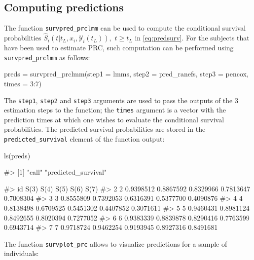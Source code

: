 \subsection{Computing predictions}\label{computing-predictions}

The function \texttt{survpred\_prclmm} can be used to compute the
conditional survival probabilities
\(\hat{S}_i(t | t_L, x_i, \mathcal{Y}_i(t_L)),\) \(t \geq t_L\) in
\eqref{eq:predsurv}. For the subjects that have been used to estimate
PRC, such computation can be performed using \texttt{survpred\_prclmm}
as follows:

\begin{Schunk}
\begin{Sinput}
preds = survpred_prclmm(step1 = lmms, step2 = pred_ranefs, step3 = pencox, times = 3:7)
\end{Sinput}
\end{Schunk}

The \texttt{step1}, \texttt{step2} and \texttt{step3} arguments are used
to pass the outputs of the 3 estimation steps to the function; the
\texttt{times} argument is a vector with the prediction times at which
one wishes to evaluate the conditional survival probabilities. The
predicted survival probabilities are stored in the
\texttt{predicted\_survival} element of the function output:

\begin{Schunk}
\begin{Sinput}
ls(preds)
\end{Sinput}
\begin{Soutput}
#> [1] "call"               "predicted_survival"
\end{Soutput}
\begin{Soutput}
#>   id      S(3)      S(4)      S(5)      S(6)      S(7)
#> 2  2 0.9398512 0.8867592 0.8329966 0.7813647 0.7008304
#> 3  3 0.8555809 0.7392053 0.6316391 0.5377700 0.4090876
#> 4  4 0.8138498 0.6709525 0.5451302 0.4407852 0.3071611
#> 5  5 0.9460431 0.8981124 0.8492655 0.8020394 0.7277052
#> 6  6 0.9383339 0.8839878 0.8290416 0.7763599 0.6943714
#> 7  7 0.9718724 0.9462254 0.9193945 0.8927316 0.8491681
\end{Soutput}
\end{Schunk}

The function \texttt{survplot\_prc} allows to visualize predictions for
a sample of individuals:

